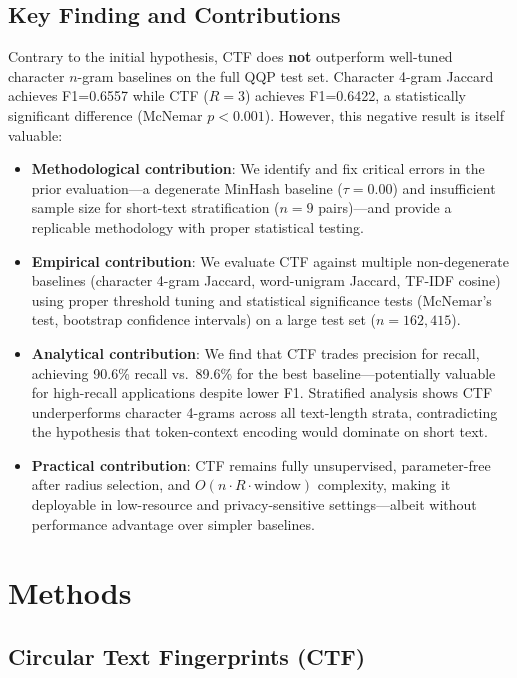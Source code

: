 \documentclass[11pt,letterpaper]{article}
\begin{document}
\subsection{Key Finding and Contributions}

Contrary to the initial hypothesis, CTF does \textbf{not} outperform well-tuned character $n$-gram baselines on the full QQP test set. Character 4-gram Jaccard achieves F1=0.6557 while CTF ($R=3$) achieves F1=0.6422, a statistically significant difference (McNemar $p{<}0.001$). However, this negative result is itself valuable:

\begin{itemize}
  \item \textbf{Methodological contribution}: We identify and fix critical errors in the prior evaluation---a degenerate MinHash baseline ($\tau=0.00$) and insufficient sample size for short-text stratification ($n=9$ pairs)---and provide a replicable methodology with proper statistical testing.

  \item \textbf{Empirical contribution}: We evaluate CTF against multiple non-degenerate baselines (character 4-gram Jaccard, word-unigram Jaccard, TF-IDF cosine) using proper threshold tuning and statistical significance tests (McNemar's test, bootstrap confidence intervals) on a large test set ($n=162{,}415$).

  \item \textbf{Analytical contribution}: We find that CTF trades precision for recall, achieving 90.6\% recall vs.\ 89.6\% for the best baseline---potentially valuable for high-recall applications despite lower F1. Stratified analysis shows CTF underperforms character 4-grams across all text-length strata, contradicting the hypothesis that token-context encoding would dominate on short text.

  \item \textbf{Practical contribution}: CTF remains fully unsupervised, parameter-free after radius selection, and $O(n \cdot R \cdot \text{window})$ complexity, making it deployable in low-resource and privacy-sensitive settings---albeit without performance advantage over simpler baselines.
\end{itemize}

\section{Methods}

\subsection{Circular Text Fingerprints (CTF)}
\end{document}
